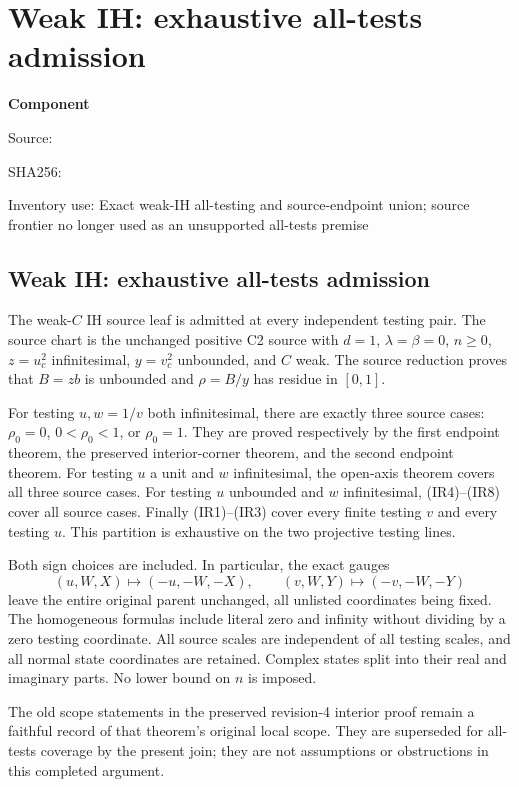 \chapter{Weak IH: exhaustive all-tests admission}
\label{component:p03eb42346077}
\noindent\textbf{Component }\par
{\small\noindent Source: \par}
{\small\noindent SHA256: \par}
{\small\noindent Inventory use: Exact weak-IH all-testing and source-endpoint union; source frontier no longer used as an unsupported all-tests premise\par}
\medskip
\section{Weak IH: exhaustive all-tests admission}
\label{p03eb42346077:sec:weak-ih-join}
The weak-$C$ IH source leaf is admitted at every independent testing
pair. The source chart is the unchanged positive C2 source with
$d=1$, $\lambda=\beta=0$, $n\ge0$, $z=u_c^2$ infinitesimal,
$y=v_c^2$ unbounded, and $C$ weak. The source reduction proves that
$B=zb$ is unbounded and $\rho=B/y$ has residue in $[0,1]$.

For testing $u,w=1/v$ both infinitesimal, there are exactly three
source cases: $\rho_0=0$, $0<\rho_0<1$, or $\rho_0=1$.
They are proved respectively by the first endpoint theorem, the
preserved interior-corner theorem, and the second endpoint theorem.
For testing $u$ a unit and $w$ infinitesimal, the open-axis theorem
covers all three source cases. For testing $u$ unbounded and $w$
infinitesimal, (IR4)--(IR8) cover all source cases. Finally (IR1)--(IR3)
cover every finite testing $v$ and every testing $u$.
This partition is exhaustive on the two projective testing lines.

Both sign choices are included. In particular, the exact gauges
\[
 (u,W,X)\mapsto(-u,-W,-X),\qquad
 (v,W,Y)\mapsto(-v,-W,-Y)
\]
leave the entire original parent unchanged, all unlisted coordinates
being fixed. The homogeneous formulas include literal zero and
infinity without dividing by a zero testing coordinate. All source
scales are independent of all testing scales, and all normal state
coordinates are retained. Complex states split into their real and
imaginary parts. No lower bound on $n$ is imposed.

The old scope statements in the preserved revision-4 interior proof
remain a faithful record of that theorem's original local scope.
They are superseded for all-tests coverage by the present join;
they are not assumptions or obstructions in this completed argument.
